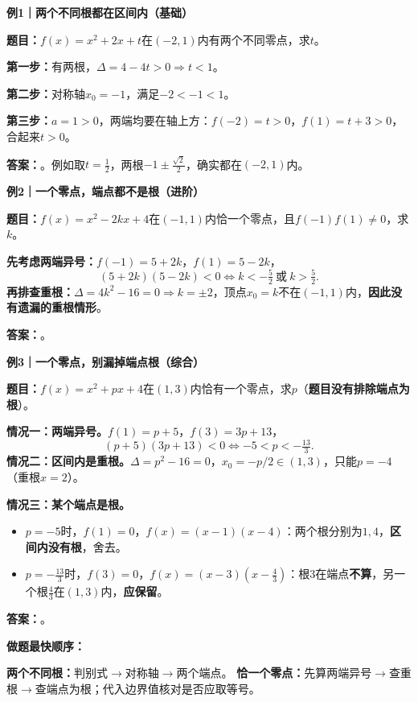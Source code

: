 \begin{examplebox}
\textbf{\textcolor{CExample}{例1｜两个不同根都在区间内（基础）}}\par
\textbf{题目：}$f(x)=x^2+2x+t$在$(-2,1)$内有两个不同零点，求$t$。
\par\textbf{第一步：}有两根，$\Delta=4-4t>0\Rightarrow t<1$。
\par\textbf{第二步：}对称轴$x_0=-1$，满足$-2<-1<1$。
\par\textbf{第三步：}$a=1>0$，两端均要在轴上方：$f(-2)=t>0$，$f(1)=t+3>0$，合起来$t>0$。
\par\textbf{答案：}。例如取$t=\frac12$，两根$-1\pm\frac{\sqrt2}{2}$，确实都在$(-2,1)$内。
\begin{center}

\end{center}

\medskip
\textbf{\textcolor{CExample}{例2｜一个零点，端点都不是根（进阶）}}\par
\textbf{题目：}$f(x)=x^2-2kx+4$在$(-1,1)$内恰一个零点，且$f(-1)f(1)\ne0$，求$k$。
\par\textbf{先考虑两端异号：}$f(-1)=5+2k$，$f(1)=5-2k$，
\[(5+2k)(5-2k)<0\iff k<-\tfrac52\ \text{或}\ k>\tfrac52.\]
\textbf{再排查重根：}$\Delta=4k^2-16=0\Rightarrow k=\pm2$，顶点$x_0=k$不在$(-1,1)$内，\textbf{因此没有遗漏的重根情形}。
\par\textbf{答案：}。
\begin{center}

\end{center}

\medskip
\textbf{\textcolor{CExample}{例3｜一个零点，别漏掉端点根（综合）}}\par
\textbf{题目：}$f(x)=x^2+px+4$在$(1,3)$内恰有一个零点，求$p$（\textbf{题目没有排除端点为根}）。
\par\textbf{情况一：两端异号。}$f(1)=p+5$，$f(3)=3p+13$，
\[(p+5)(3p+13)<0\iff -5<p<-\tfrac{13}{3}.\]
\textbf{情况二：区间内是重根。}$\Delta=p^2-16=0$，$x_0=-p/2\in(1,3)$，只能$p=-4$（重根$x=2$）。
\par\textbf{情况三：某个端点是根。}
\begin{itemize}[leftmargin=*,itemsep=.2em]
 \item $p=-5$时，$f(1)=0$，$f(x)=(x-1)(x-4)$：两个根分别为$1,4$，\textbf{区间内没有根}，舍去。
 \item $p=-\frac{13}{3}$时，$f(3)=0$，$f(x)=(x-3)(x-\frac43)$：根$3$在端点\textbf{不算}，另一个根$\frac43$在$(1,3)$内，\textbf{应保留}。
\end{itemize}
\textbf{答案：}\boxed{p\in(-5,-\tfrac{13}{3}]\cup\{-4\}}。
\begin{center}

\end{center}

\medskip
\textbf{\textcolor{CExample}{做题最快顺序：}}\par
\textbf{两个不同根：}判别式$\rightarrow$对称轴$\rightarrow$两个端点。\quad
\textbf{恰一个零点：}先算两端异号$\rightarrow$查重根$\rightarrow$查端点为根；代入边界值核对是否应取等号。
\end{examplebox}
